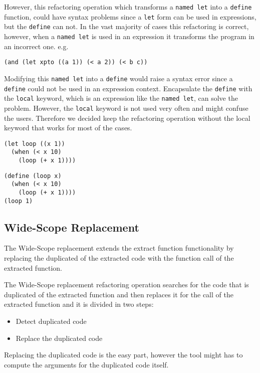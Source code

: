 However, this refactoring operation which transforms a {\tt named let} into a {\tt define} function,
 could have syntax problems since a {\tt let} form can be used in expressions, but the {\tt define} can not.
In the vast majority of cases this refactoring is correct, however, when a {\tt named let} is used in an expression
it transforms the program in an incorrect one.
e.g.
\begin{lstlisting}[basicstyle=\ttfamily, caption=Let in an expression]
(and (let xpto ((a 1)) (< a 2)) (< b c))
\end{lstlisting}
Modifying this {\tt named let} into a {\tt define} would raise a syntax error since a
{\tt define} could not be used in an expression context.
Encapsulate the {\tt define} with the {\tt local} keyword, which is an expression like
the {\tt named let}, can solve the problem.
However, the {\tt local} keyword is not used very often and might confuse the users.
Therefore we decided keep the refactoring operation without the local keyword that works for
most of the cases.

\begin{lstlisting}[basicstyle=\ttfamily, caption=Let example]
(let loop ((x 1))
  (when (< x 10)
    (loop (+ x 1))))
\end{lstlisting}
\begin{lstlisting}[basicstyle=\ttfamily, caption=Let to Define Function example]
(define (loop x)
  (when (< x 10)
    (loop (+ x 1))))
(loop 1)
\end{lstlisting}

\subsection{Wide-Scope Replacement}
The Wide-Scope replacement extends the extract function functionality by replacing
the duplicated of the extracted code with the function call of the extracted function.


The Wide-Scope replacement refactoring operation searches for the code that is duplicated of the extracted
function and then replaces it for the call of the
extracted function and it is divided in two steps:
\begin{itemize}
\item Detect duplicated code
\item Replace the duplicated code
\end{itemize}

Replacing the duplicated code is the easy part, however the tool might has to compute
the arguments for the duplicated code itself.

